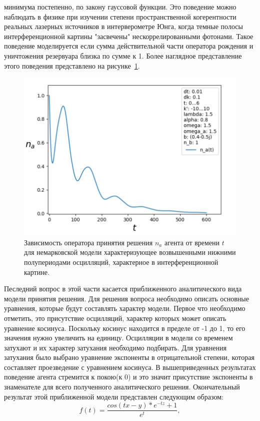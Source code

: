минимума постепенно, по закону гауссовой функции.
Это поведение можно наблюдать в физике при изучении степени пространственной когерентности реальных
лазерных источников в интерверометре Юнга, когда темные полосы интерференционной картины "засвечены"
нескоррелированными фотонами.
Такое поведение моделируется если сумма действительной части оператора рождения и уничтожения резервуара
близка по сумме к 1.
Более наглядное представление этого поведения представлено на рисунке~\ref{fig:sr_gauss}.
\begin{figure}[h!]
    \centering
    \captionsetup{justification=centering}
    \includegraphics[width=0.7\linewidth]{pictures/result_second_4.png}
    \caption{Зависимость оператора принятия решения $n_{a}$ агента от времени $t$ для немарковской модели
    характеризующее возвышенными нижними полупериодами осцилляций, характерное в интерференционной картине.}
    \label{fig:sr_gauss}
\end{figure}
Песледний вопрос в этой части касается приближенного аналитического вида модели принятия решения.
Для решения вопроса необходимо описать основные уравнения, которые будут составлять характер модели.
Первое что необходимо отметить, это присутствие осцилляций, характер которых может описать уравнение
косинуса.
Поскольку косинус находится в пределе от -1 до 1, то его значения нужно увеличить на единицу.
Осцилляции в модели со временем затухают и их характер затухания необходимо подбирать.
Для уравнения затухания было выбрано уравнение экспоненты в отрицательной степени, которая составляет
проезведение с уравнением косинуса.
В вышеприведенных результатах поведение агента стремится к покою(к 0) и это значит присутствие экспоненты
в знаменателе для всего полученного аналитического решения.
Окончательный результат этой приближенной модели представлен следующим образом:
\begin{equation}
    f(t) = \frac{cos(tx - y)*e^{-tz} + 1}{e^{t}},
\end{equation}
